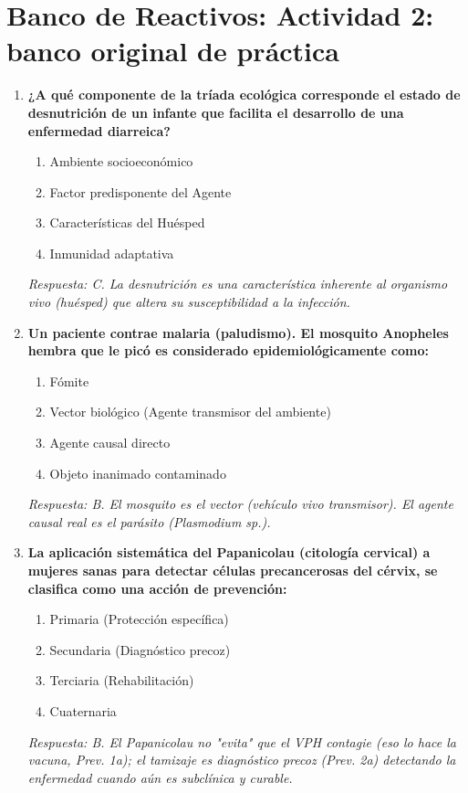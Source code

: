 \newpage
\section{Banco de Reactivos: Actividad 2: banco original de práctica}
\begin{enumerate}[label=\textbf{\arabic*.}]
    \item \textbf{¿A qué componente de la tríada ecológica corresponde el estado de desnutrición de un infante que facilita el desarrollo de una enfermedad diarreica?}
    \begin{enumerate}
        \item[A)] Ambiente socioeconómico
        \item[B)] Factor predisponente del Agente
        \item[C)] Características del Huésped
        \item[D)] Inmunidad adaptativa
    \end{enumerate}
    \textit{Respuesta: C. La desnutrición es una característica inherente al organismo vivo (huésped) que altera su susceptibilidad a la infección.}

    \item \textbf{Un paciente contrae malaria (paludismo). El mosquito Anopheles hembra que le picó es considerado epidemiológicamente como:}
    \begin{enumerate}
        \item[A)] Fómite
        \item[B)] Vector biológico (Agente transmisor del ambiente)
        \item[C)] Agente causal directo
        \item[D)] Objeto inanimado contaminado
    \end{enumerate}
    \textit{Respuesta: B. El mosquito es el vector (vehículo vivo transmisor). El agente causal real es el parásito (Plasmodium sp.).}

    \item \textbf{La aplicación sistemática del Papanicolau (citología cervical) a mujeres sanas para detectar células precancerosas del cérvix, se clasifica como una acción de prevención:}
    \begin{enumerate}
        \item[A)] Primaria (Protección específica)
        \item[B)] Secundaria (Diagnóstico precoz)
        \item[C)] Terciaria (Rehabilitación)
        \item[D)] Cuaternaria
    \end{enumerate}
    \textit{Respuesta: B. El Papanicolau no "evita" que el VPH contagie (eso lo hace la vacuna, Prev. 1a); el tamizaje es diagnóstico precoz (Prev. 2a) detectando la enfermedad cuando aún es subclínica y curable.}


\end{enumerate}
